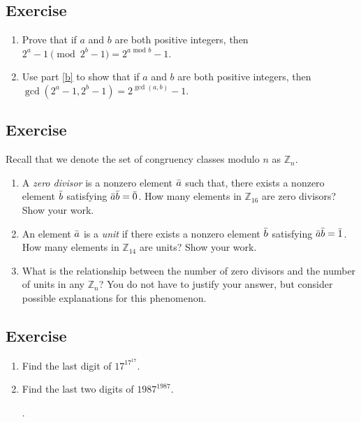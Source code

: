 \documentclass{article}
\newcounter{counter}
\newcommand{\Exercise}{Exercise \stepcounter{counter}\thecounter}
\begin{document}
\subsection*{\Exercise}
    \begin{enumerate}
        \item \label{b} Prove that if $a$ and $b$ are both positive integers, then $2^{a} - 1 \pmod{2^{b} - 1} = 2^{a \text{ mod $b$}} - 1$.
        
        \item Use part \ref{b} to show that if $a$ and $b$ are both positive integers, then $\gcd(2^{a} - 1, 2^{b} - 1) = 2^{\gcd(a, b)} - 1$.
    \end{enumerate}

\subsection*{\Exercise}
    Recall that we denote the set of congruency classes modulo $n$ as $\mathbb{Z}_{n}$.
    \begin{enumerate}
        \item A \textit{zero divisor} is a nonzero element $\Bar{a}$ such that, there exists a nonzero element $\Bar{b}$ satisfying $\Bar{a}\Bar{b} = \Bar{0}$. How many elements in $\mathbb{Z}_{16}$ are zero divisors? Show your work.
        \item An element $\Bar{a}$ is a \textit{unit} if there exists a nonzero element $\Bar{b}$ satisfying $\Bar{a}\Bar{b} = \Bar{1}$. How many elements in $\mathbb{Z}_{14}$ are units? Show your work.
        \item What is the relationship between the number of zero divisors and the number of units in any $\mathbb{Z}_{n}$? You do not have to justify your answer, but consider possible explanations for this phenomenon.
    \end{enumerate}

\subsection*{\Exercise}
    \begin{enumerate}
        \item Find the last digit of $17^{17^{17}}$.
        \item Find the last two digits of $1987^{1987}$. 
        
        .
    \end{enumerate}
\end{document}
